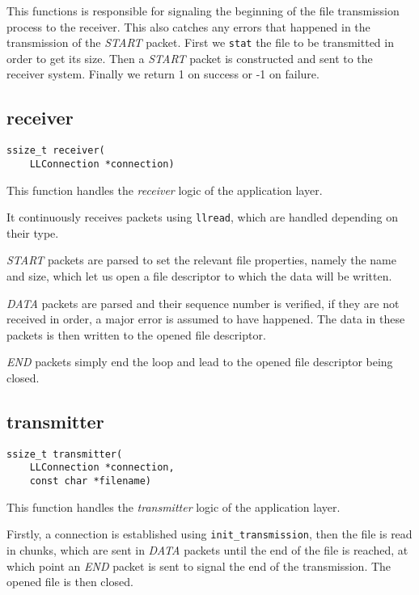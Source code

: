 \documentclass[11pt,a4paper,twocolumn]{article}
\begin{document}
This functions is responsible for signaling the beginning of the file transmission process to the receiver.
This also catches any errors that happened in the transmission of the \textit{START} packet.
First we \lstinline{stat} the file to be transmitted in order to get its size. Then a \textit{START} packet is constructed and sent to the receiver system.
Finally we return 1 on success or -1 on failure.

\subsection{receiver}

\begin{lstlisting}
ssize_t receiver(
    LLConnection *connection)
\end{lstlisting}

This function handles the \textit{receiver} logic of the application layer.

It continuously receives packets using \lstinline{llread}, which are handled depending on their type.

\textit{START} packets are parsed to set the relevant file properties, namely the name and size, which let us open a file descriptor to which the data will be written.

\textit{DATA} packets are parsed and their sequence number is verified, if they are not received in order, a major error is assumed to have happened.
The data in these packets is then written to the opened file descriptor.

\textit{END} packets simply end the loop and lead to the opened file descriptor being closed.

\subsection{transmitter}

\begin{lstlisting}
ssize_t transmitter(
    LLConnection *connection,
    const char *filename)
\end{lstlisting}

This function handles the \textit{transmitter} logic of the application layer.

Firstly, a connection is established using \lstinline{init_transmission}, then the file is read in chunks, which are sent in \textit{DATA} packets until the end of the file is reached, at which point an \textit{END} packet is sent to signal the end of the transmission. The opened file is then closed.
\end{document}
